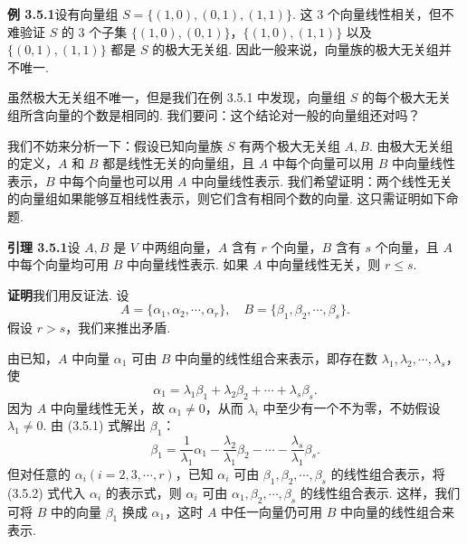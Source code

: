 \documentclass[UTF8,12pt,a4paper,fontset=fandol]{ctexart}
\begin{document}
\noindent\textbf{例 3.5.1}\quad 设有向量组 $S=\{(1,0),(0,1),(1,1)\}$. 这 3 个向量线性相关，但不难验证 $S$ 的 3 个子集 $\{(1,0),(0,1)\}$，$\{(1,0),(1,1)\}$ 以及 $\{(0,1),(1,1)\}$ 都是 $S$ 的极大无关组. 因此一般来说，向量族的极大无关组并不唯一.

虽然极大无关组不唯一，但是我们在例 3.5.1 中发现，向量组 $S$ 的每个极大无关组所含向量的个数是相同的. 我们要问：这个结论对一般的向量组还对吗？

我们不妨来分析一下：假设已知向量族 $S$ 有两个极大无关组 $A,B$. 由极大无关组的定义，$A$ 和 $B$ 都是线性无关的向量组，且 $A$ 中每个向量可以用 $B$ 中向量线性表示，$B$ 中每个向量也可以用 $A$ 中向量线性表示. 我们希望证明：两个线性无关的向量组如果能够互相线性表示，则它们含有相同个数的向量. 这只需证明如下命题.

\noindent\textbf{引理 3.5.1}\quad 设 $A,B$ 是 $V$ 中两组向量，$A$ 含有 $r$ 个向量，$B$ 含有 $s$ 个向量，且 $A$ 中每个向量均可用 $B$ 中向量线性表示. 如果 $A$ 中向量线性无关，则 $r\leq s$.

\noindent\textbf{证明}\quad 我们用反证法. 设
\[
A=\{\alpha_1,\alpha_2,\cdots,\alpha_r\},\quad
B=\{\beta_1,\beta_2,\cdots,\beta_s\}.
\]
假设 $r>s$，我们来推出矛盾.

由已知，$A$ 中向量 $\alpha_1$ 可由 $B$ 中向量的线性组合来表示，即存在数 $\lambda_1,\lambda_2,\cdots,\lambda_s$，使
\begin{equation}
\alpha_1=\lambda_1\beta_1+\lambda_2\beta_2+\cdots+\lambda_s\beta_s.
\tag{3.5.1}
\end{equation}
因为 $A$ 中向量线性无关，故 $\alpha_1\neq 0$，从而 $\lambda_i$ 中至少有一个不为零，不妨假设 $\lambda_1\neq 0$. 由 (3.5.1) 式解出 $\beta_1$：
\begin{equation}
\beta_1=\frac{1}{\lambda_1}\alpha_1-\frac{\lambda_2}{\lambda_1}\beta_2-\cdots-\frac{\lambda_s}{\lambda_1}\beta_s.
\tag{3.5.2}
\end{equation}
但对任意的 $\alpha_i(i=2,3,\cdots,r)$，已知 $\alpha_i$ 可由 $\beta_1,\beta_2,\cdots,\beta_s$ 的线性组合表示，将 (3.5.2) 式代入 $\alpha_i$ 的表示式，则 $\alpha_i$ 可由 $\alpha_1,\beta_2,\cdots,\beta_s$ 的线性组合表示. 这样，我们可将 $B$ 中的向量 $\beta_1$ 换成 $\alpha_1$，这时 $A$ 中任一向量仍可用 $B$ 中向量的线性组合来表示.
\end{document}
